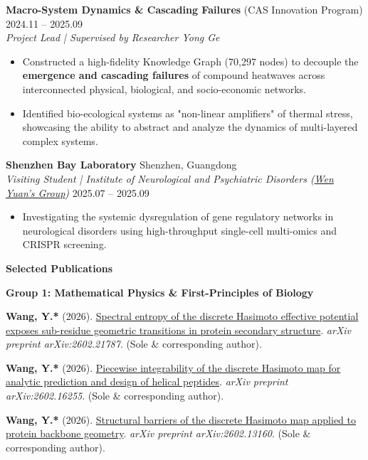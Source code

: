 \documentclass[10pt]{article}
\begin{document}
	\vspace{2pt}
	\textbf{Macro-System Dynamics \& Cascading Failures} (CAS Innovation Program) \hfill 2024.11 – 2025.09 \\
	\textit{Project Lead | Supervised by Researcher Yong Ge}
	\begin{itemize}[noitemsep, topsep=2pt, partopsep=0pt, parsep=0pt, leftmargin=*]
		\item Constructed a high-fidelity Knowledge Graph (70,297 nodes) to decouple the \textbf{emergence and cascading failures} of compound heatwaves across interconnected physical, biological, and socio-economic networks.
		\item Identified bio-ecological systems as "non-linear amplifiers" of thermal stress, showcasing the ability to abstract and analyze the dynamics of multi-layered complex systems.
	\end{itemize}
	
	\vspace{2pt}
	\textbf{Shenzhen Bay Laboratory} \hfill Shenzhen, Guangdong \\
	\textit{Visiting Student | Institute of Neurological and Psychiatric Disorders (\href{https://www.szbl.ac.cn/research/group/Wen-Yuan.htm}{Wen Yuan's Group})} \hfill 2025.07 – 2025.09
	\begin{itemize}[noitemsep, topsep=2pt, partopsep=0pt, parsep=0pt, leftmargin=*]
		\item Investigating the systemic dysregulation of gene regulatory networks in neurological disorders using high-throughput single-cell multi-omics and CRISPR screening.
	\end{itemize}
	
	\vspace{2pt}
	\begin{center}
		\textbf{\large Selected Publications}
	\end{center}
	\vspace{-4pt}
	
	\textbf{Group 1: Mathematical Physics \& First-Principles of Biology}
	\begin{enumerate}[noitemsep, topsep=2pt, partopsep=0pt, parsep=0pt, leftmargin=*, label={[\arabic*]}]
		\item \textbf{Wang, Y.*} (2026). \href{https://arxiv.org/abs/2602.21787}{Spectral entropy of the discrete Hasimoto effective potential exposes sub-residue geometric transitions in protein secondary structure}. \textit{arXiv preprint arXiv:2602.21787}. (Sole \& corresponding author).
		\item \textbf{Wang, Y.*} (2026). \href{https://arxiv.org/abs/2602.16255}{Piecewise integrability of the discrete Hasimoto map for analytic prediction and design of helical peptides}. \textit{arXiv preprint arXiv:2602.16255}. (Sole \& corresponding author).
		\item \textbf{Wang, Y.*} (2026). \href{https://arxiv.org/abs/2602.13160}{Structural barriers of the discrete Hasimoto map applied to protein backbone geometry}. \textit{arXiv preprint arXiv:2602.13160}. (Sole \& corresponding author).
	\end{enumerate}
	
\end{document}
